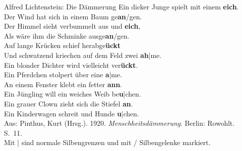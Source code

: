 \begin{frame}
  {Alfred Lichtenstein: Die Dämmerung}
  \pause
  \small
  Ein dicker Junge spielt mit einem \textbf{\alert<3>{eich}}.\\
  Der Wind hat sich in einem Baum ge\textbf{\alert<4>{an}}/gen.\\
  Der Himmel sieht verbummelt aus und \textbf{\alert<3>{eich}},\\
  Als wäre ihm die Schminke ausge\textbf{\alert<4>{an}}/gen.\\
  \Zeile
  Auf lange Krücken schief herabge\textbf{\alert<5>{ückt}}\\
  Und schwatzend kriechen auf dem Feld zwei \textbf{\alert<6>{ah}}|me.\\
  Ein blonder Dichter wird vielleicht ver\textbf{\alert<5>{ückt}}.\\
  Ein Pferdchen stolpert über eine \textbf{\alert<6>{a}}|me.\\
  \Zeile
  An einem Fenster klebt ein fetter \textbf{\alert<7>{ann}}.\\
  Ein Jüngling will ein weiches Weib be\textbf{\alert<8>{u}}|chen.\\
  Ein grauer Clown zieht sich die Stiefel \textbf{\alert<7>{an}}.\\
  Ein Kinderwagen schreit und Hunde \textbf{\alert<8>{u}}|chen.\\
  \Zeile
  \footnotesize
  Aus: Pinthus, Kurt (Hrsg.). 1920. \textit{Menschheitsdämmerung}. Berlin: Rowohlt. S.~11.\\
  Mit | sind normale Silbengrenzen und mit / Silbengelenke markiert.
\end{frame}

